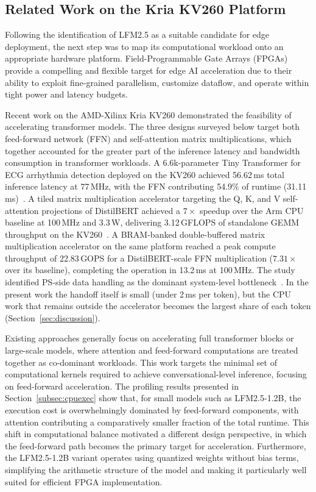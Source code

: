 \subsection{Related Work on the Kria KV260 Platform}
Following the identification of LFM2.5 as a suitable candidate for edge deployment,
the next step was to map its computational workload onto an appropriate hardware
platform. Field-Programmable Gate Arrays (FPGAs) provide a compelling and flexible
target for edge AI acceleration due to their ability to exploit fine-grained
parallelism, customize dataflow, and operate within tight power and latency budgets.

Recent work on the AMD-Xilinx Kria KV260 demonstrated the feasibility of
accelerating transformer models. The three designs surveyed below target both
feed-forward network (FFN) and self-attention matrix multiplications, which together
accounted for the greater part of the inference latency and bandwidth consumption in
transformer workloads. A 6.6k-parameter Tiny Transformer for ECG arrhythmia
detection deployed on the KV260 achieved 56.62\,ms total inference latency at
77\,MHz, with the FFN contributing 54.9\% of runtime (31.11\,ms)~\cite{11310944tin}.
A tiled matrix multiplication accelerator targeting the Q, K, and V self-attention
projections of DistilBERT achieved a $7\times$ speedup over the Arm CPU baseline at
100\,MHz and 3.3\,W, delivering 3.12\,GFLOPS of standalone GEMM throughput on the
KV260~\cite{li2025fpgabasedhardware}. A BRAM-banked double-buffered matrix
multiplication accelerator on the same platform reached a peak compute throughput of
22.83\,GOPS for a DistilBERT-scale FFN multiplication ($7.31\times$ over its
baseline), completing the operation in 13.2\,ms at 100\,MHz. The study identified
PS-side data handling as the dominant system-level bottleneck~\cite{11311069}. In the
present work the handoff itself is small (under 2\,ms per token), but the CPU work that
remains outside the accelerator becomes the largest share of each token
(Section~\ref{sec:discussion}).

Existing approaches generally focus on accelerating full transformer blocks or
large-scale models, where attention and feed-forward computations are treated
together as co-dominant workloads. This work targets the minimal set of computational
kernels required to achieve conversational-level inference, focusing on feed-forward
acceleration. The profiling results presented in Section~\ref{subsec:cpuexec} show
that, for small models such as LFM2.5-1.2B, the execution cost is overwhelmingly
dominated by feed-forward components, with attention contributing a comparatively
smaller fraction of the total runtime. This shift in computational balance motivated a
different design perspective, in which the feed-forward path becomes the primary
target for acceleration. Furthermore, the LFM2.5-1.2B variant operates using quantized
weights without bias terms, simplifying the arithmetic structure of the model and
making it particularly well suited for efficient FPGA implementation.

